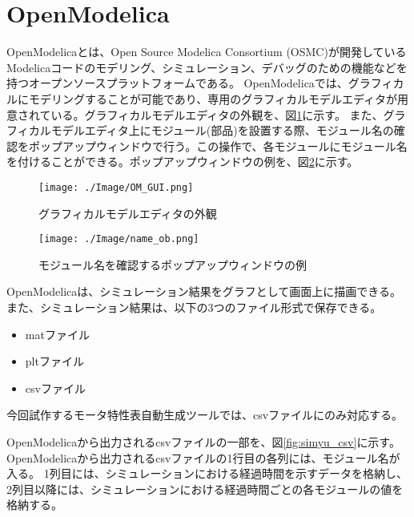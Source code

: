 \section{OpenModelica}\label{OM}
OpenModelicaとは、Open Source Modelica Consortium (OSMC)が開発しているModelicaコードのモデリング、シミュレーション、デバッグのための機能などを
持つオープンソースプラットフォームである\cite{fritzson2006openmodelica}。
OpenModelicaでは、グラフィカルにモデリングすることが可能であり、専用のグラフィカルモデルエディタが用意されている。グラフィカルモデルエディタの外観を、図\ref{fig:OM_GUI}に示す。
また、グラフィカルモデルエディタ上にモジュール(部品)を設置する際、モジュール名の確認をポップアップウィンドウで行う。この操作で、各モジュールにモジュール名を付けることができる。ポップアップウィンドウの例を、図\ref{fig:name_ob}に示す。
\begin{figure}[t]
	\centering
	\texttt{[image: ./Image/OM\_GUI.png]}
	\caption{グラフィカルモデルエディタの外観}
	\label{fig:OM_GUI}
\end{figure}
\begin{figure}[t]
	\centering
	\texttt{[image: ./Image/name\_ob.png]}
	\caption{モジュール名を確認するポップアップウィンドウの例}
	\label{fig:name_ob}
\end{figure}
OpenModelicaは、シミュレーション結果をグラフとして画面上に描画できる。また、シミュレーション結果は、以下の3つのファイル形式で保存できる。
\begin{itemize}
    \item matファイル
    \item pltファイル
    \item csvファイル
\end{itemize}

今回試作するモータ特性表自動生成ツールでは、csvファイルにのみ対応する。

OpenModelicaから出力されるcsvファイルの一部を、図\ref{fig:simyu_csv}に示す。
OpenModelicaから出力されるcsvファイルの1行目の各列には、モジュール名が入る。
1列目には、シミュレーションにおける経過時間を示すデータを格納し、2列目以降には、シミュレーションにおける経過時間ごとの各モジュールの値を格納する。

